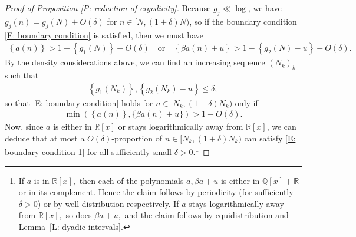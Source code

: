 \documentclass[11pt]{amsart}
\theoremstyle{definition}
\newcommand{\Q}{{\mathbb Q}}
\newcommand{\R}{{\mathbb R}}
\newcommand{\Z}{{\mathbb Z}}
\newcommand{\veps}{\varepsilon}
\newcommand{\1}{{\mathbf{1}}}
\newcommand{\rem}[1]{\left \{ #1 \right \}}
\newcommand{\srem}[1]{ \{ #1 \}}
\begin{document}
\begin{proof}[Proof of Proposition \ref{P: reduction of ergodicity}]
Because $g_j\ll\log$, we have $g_j(n) = g_j(N) + O(\delta)$ for $n\in[N, (1+\delta)N)$, so if the boundary condition \eqref{E: boundary condition} is satisfied, then we must have
 \begin{align*}
     \rem{{a}(n)} > 1 - \rem{g_1(N)}-O(\delta) \quad \textrm{or}\quad \rem{\beta{a}(n)+u} > 1 - \rem{g_2(N)-u}-O(\delta).
 \end{align*}
 By the density considerations above, we can find an increasing sequence $(N_k)_k$ such that
\begin{align}\label{E: a dense subsequence}
    \rem{g_1(N_k)}, \rem{g_2(N_k)-u}\leq \delta,
\end{align}
so that \eqref{E: boundary condition} holds for $n\in[N_k, (1+\delta)N_k)$ only if
 \begin{align}\label{E: boundary condition 1}
     \min(\rem{{a}(n)}, \srem{\beta {a}(n)+u}) > 1 -O(\delta). %
 \end{align}
Now, since ${a}$ is either in $\R[x]$ or stays logarithmically away from $\R[x]$, we can deduce that at most a $O(\delta)$-proportion of $n\in[N_k, (1+\delta)N_k)$ can satisfy \eqref{E: boundary condition 1} for all sufficiently small $\delta>0$.\footnote{
If $a$ is in $\R[x],$ then each of the polynomials $a, \beta a+u$ is either in $\Q[x]+\R$ or in its complement. Hence the claim follows by periodicity (for sufficiently $\delta>0$) or by well distribution respectively. If $a$ stays logarithmically away from $\R[x],$ so does $\beta a +u,$ and the claim follows by equidistribution and Lemma~\ref{L: dyadic intervals}.}

\end{proof}
\end{document}
